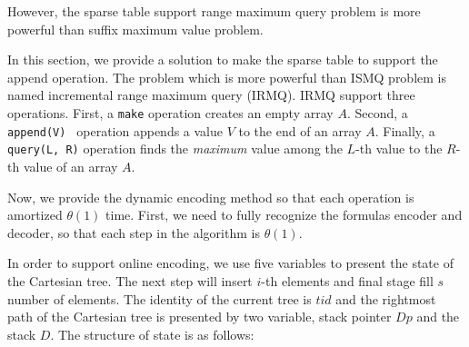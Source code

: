 However, the sparse table support range maximum query problem is more
powerful than suffix maximum value problem.

In this section, we provide a solution to make the sparse table to
support the append operation. The problem which is more powerful than
ISMQ problem is named incremental range maximum query (IRMQ).  IRMQ
support three operations.  First, a {\tt make} operation creates an
empty array $A$.  Second, a {\tt append(V) } operation appends a value
$V$ to the end of an array $A$.  Finally, a {\tt query(L, R)}
operation finds the {\em maximum} value among the $L$-th value to the
$R$-th value of an array $A$.

\iffalse

ISMQ 已知解法有二，其一使用並查集在 $O(\alpha(n))$ 解決單一操作，其二
使用樸素的稀疏表在 $O(\log n)$完成插入操作、$O(1)$ 完成詢問操作。其二，
Fischer \cite{fischer} 提出的 $\theta(n)$ -- $\theta(1)$ 無法應用在此，
其原因在於插入元素時，無法動態決定 in-block 的最大值，必須等到整個
in-block 塞滿至預設值才可解決。

在我們的應用中維護後綴最大值，
拓展其操作成為增長區間最大值查找 (\emph{incremental range maximum query}, IRMQ)，
其支援兩項操作：
\fi

Now, we provide the dynamic encoding method so that each operation is
amortized $\theta(1)$ time.  First, we need to fully recognize the
formulas encoder and decoder, so that each step in the algorithm is
$\theta(1)$.


\iffalse

接下來的幾段中，我們提供動態的編碼方式使得每一操作皆均攤 $\theta(1)$
完成。首先，我們需要充分認知編碼相互轉換的公式，藉以在算法中完成每一步
皆為 $\theta(1)$ 的要求。

在上一節提出對於任意編號 $\mathit{tid}$ 可以在 $O(n)$ 時間內得到
$\langle\mathit{lsz},\mathit{lid},\mathit{rsz},\mathit{rid}\rangle$；
相反地，可以在 $\theta(1)$ 時間內逆推得到 $\mathit{tid}$，如算法
~\ref{alg:encode-tid}。透過預處理，事先將所有前綴和保存下來，在算法中
的迴圈可視為一次內存存取，使得時間複雜度 $\theta(1)$。\fi




\iffalse
根據先前的字典順序編碼，只需要維護笛卡爾樹的右鏈，實作上與堆疊結構相同。
基於 row-major 順序和遞迴定義 ~\ref{fun:LCA}，修改之前論文對於的離線編碼，
其對應方案如算法 \ref{alg:cartesian-encode-offline}。
\fi

In order to support online encoding, we use five variables to present
the state of the Cartesian tree.  The next step will insert $i$-th
elements and final stage fill $s$ number of elements.  The identity of
the current tree is $\mathit{tid}$ and the rightmost path of the
Cartesian tree is presented by two variable, stack pointer
$\mathit{Dp}$ and the stack $\mathit{D}$. The structure of state is as
follows:

